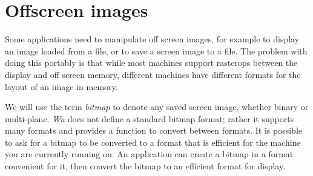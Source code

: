 \section{Offscreen images}
\label{image}
Some applications need to manipulate off screen images, for example to
display an image loaded from a file, or to save a screen image to a
file.
The problem with doing this portably is that while most machines
support rasterops between the display and off screen memory,
different machines have different formats for the layout of an image
in memory.

We will use the term {\em bitmap} to denote any saved screen image,
whether binary or multi-plane.
{\em Wn} does not define a standard bitmap format; rather it supports
many formats and provides a function to convert between formats.
It is possible to ask for a bitmap to be converted to a format that is
efficient for the machine you are currently running on.
An application can create a bitmap in a format convenient for it, then
convert the bitmap to an efficient format for display.

